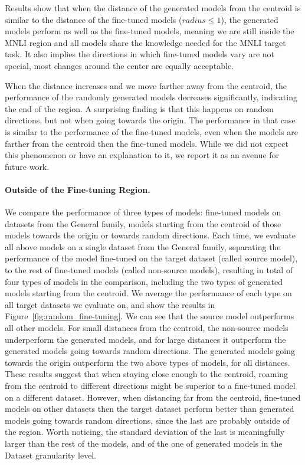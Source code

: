 \documentclass[nohyperref]{article}
\theoremstyle{plain}
\theoremstyle{definition}
\theoremstyle{remark}
\begin{document}
Results show that when the distance of the generated models from the centroid is similar to the distance of the fine-tuned models ($radius\le1$), the generated models perform as well as the fine-tuned models, meaning we are still inside the MNLI region and all models share the knowledge needed for the MNLI target task. It also implies the directions in which fine-tuned models vary are not special, most changes around the center are equally acceptable.

When the distance increases and we move farther away from the centroid, the performance of the randomly generated models decreases significantly, indicating the end of the region. A surprising finding is that this happens on random directions, but not when going towards the origin. The performance in that case is similar to the performance of the fine-tuned models, even when the models are farther from the centroid then the fine-tuned models. While we did not expect this phenomenon or have an explanation to it, we report it as an avenue for future work.


\paragraph{Outside of the Fine-tuning Region.}
We compare the performance of three types of models: fine-tuned models on datasets from the {General} family, models starting from the centroid of those models towards the origin or towards random directions. Each time, we evaluate all above models on a single dataset from the {General} family, separating the performance of the model fine-tuned on the target dataset (called source model), to the rest of fine-tuned models (called non-source models), resulting in total of four types of models in the comparison, including the two types of generated models starting from the centroid. 
We average the performance of each type on all target datasets we evaluate on, and show the results in Figure~\ref{fig:random_fine-tuning}. We can see that the source model outperforms all other models. For small distances from the centroid, the non-source models underperform the generated models, and for large distances it outperform the generated models going towards random directions. The generated models going towards the origin outperform the two above types of models, for all distances. These results suggest that when staying close enough to the centroid, roaming from the centroid to different directions might be superior to a fine-tuned model on a different dataset. However, when distancing far from the centroid, fine-tuned models on other datasets then the target dataset perform better than generated models going towards random directions, since the last are probably outside of the region. 
Worth noticing, the standard deviation of the last is meaningfully larger than the rest of the models, and of the one of generated models in the {Dataset} granularity level. 
\end{document}
